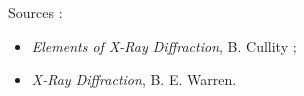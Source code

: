 \documentclass[a4paper,justified,twoside,nobib]{tufte-book}
\renewcommand{\=}[1]{\stackrel{#1}{=}} %
\begin{document}



Sources :
    \begin{itemize}
        \item \emph{Elements of X-Ray Diffraction}, B. Cullity ;
        \item \emph{X-Ray Diffraction}, B. E. Warren.
    \end{itemize}

    \vspace{2cm}


\end{document}
